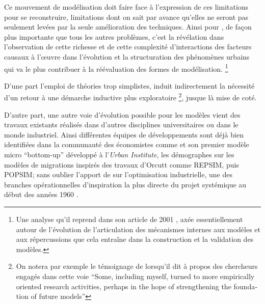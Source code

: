 Ce mouvement de modélisation doit faire face à l'expression de ces limitations pour se reconstruire, limitations dont on sait par avance qu'elles ne seront pas seulement levées par la seule amélioration des techniques. Ainsi pour \textcite[11]{Batty1976}, de façon plus importante que tous les autres problèmes, c'est la révélation dans l'observation de cette richesse et de cette complexité d'interactions des facteurs causaux à l’œuvre dans l'évolution et la structuration des phénomènes urbains qui va le plus contribuer à la réévaluation des formes de modélisation. \footnote{Une analyse qu'il reprend dans son article de 2001 \autocite{Batty2001}, axée essentiellement autour de l'évolution de l'articulation des mécanismes internes aux modèles et aux répercussions que cela entraîne dans la construction et la validation des modèles.}

D'une part l'emploi de théories trop simplistes, induit indirectement la nécessité d'un retour à une démarche inductive plus exploratoire \footnote{On notera par exemple le témoignage de \textcite{Boyce1988} lorsqu'il dit à propos des chercheurs engagés dans cette voie \foreignquote{english}{Some, including myself, turned to more empirically oriented research activities, perhaps in the hope of strengthening the foundation of future models}}, jusque là mise de coté. 

D'autre part, une autre voie d'évolution possible pour les modèles vient des travaux existants réalisés dans d'autres disciplines universitaires ou dans le monde industriel. Ainsi différentes équipes de développements sont déjà bien identifiées dans la communauté des économistes comme \textcite{Orcutt1960} et son premier modèle micro \foreignquote{english}{bottom-up} développé à l'\textit{Urban Institute}, les démographes sur les modèles de migrations inspirés des travaux d'Orcutt comme REPSIM, puis POPSIM; sans oublier l'apport de \textcite{Forrester1961} sur l'optimisation industrielle, une des branches opérationnelles d'inspiration la plus directe du projet systémique au début des années 1960 \autocites{Cohen1961}[911]{Shubik1960b}.

